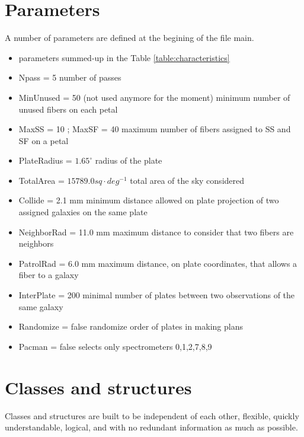 \documentclass{extarticle}
\begin{document}
\section{Parameters}
A number of parameters are defined at the begining of the file main.
\begin{itemize} 
	\item parameters summed-up in the Table \ref{table:characteristics}
	\item Npass = 5 number of passes
	\item MinUnused = 50 (not used anymore for the moment) minimum number of unused fibers on each petal
	\item MaxSS = 10 ; MaxSF = 40 maximum number of fibers assigned to SS and SF on a petal
	\item PlateRadius = $1.65^{\circ}$ radius of the plate
	\item TotalArea = $15789.0 sq \cdot deg^{-1}$ total area of the sky considered
	\item Collide = 2.1 mm minimum distance allowed on plate projection of two assigned galaxies on the same plate
	\item NeighborRad = 11.0 mm maximum distance to consider that two fibers are neighbors
	\item PatrolRad = 6.0 mm maximum distance, on plate coordinates, that allows a fiber to a galaxy
	\item InterPlate = 200 minimal number of plates between two observations of the same galaxy
	\item Randomize = false randomize order of plates in making plans
	\item Pacman = false selects only spectrometers 0,1,2,7,8,9
\end{itemize} 


\section{Classes and structures}
Classes and structures are built to be independent of each other, flexible, quickly understandable, logical, and with no redundant information as much as possible.
\end{document}
